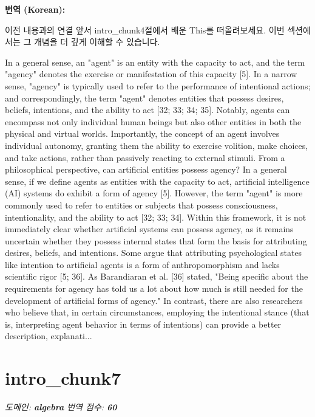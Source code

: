 \documentclass[12pt,a4paper]{article}
\begin{document}
\begin{mdframed}[style=ko]
\noindent\textbf{\small 번역 (Korean):}\\[2pt]
\begin{linkbox}{이전 내용과의 연결}
  앞서 intro_chunk4절에서 배운 This를 떠올려보세요. 이번 섹션에서는 그 개념을 더 깊게 이해할 수 있습니다.
\end{linkbox}
In a general sense, an "agent" is an entity with the capacity to act, and the term "agency" denotes the exercise or manifestation of this capacity [5]. In a narrow sense, "agency" is typically used to refer to the performance of intentional actions; and correspondingly, the term "agent" denotes entities that possess desires, beliefs, intentions, and the ability to act [32; 33; 34; 35]. Notably, agents can encompass not only individual human beings but also other entities in both the physical and virtual worlds. Importantly, the concept of an agent involves individual autonomy, granting them the ability to exercise volition, make choices, and take actions, rather than passively reacting to external stimuli. From a philosophical perspective, can artificial entities possess agency? In a general sense, if we define agents as entities with the capacity to act, artificial intelligence (AI) systems do exhibit a form of agency [5]. However, the term "agent" is more commonly used to refer to entities or subjects that possess consciousness, intentionality, and the ability to act [32; 33; 34]. Within this framework, it is not immediately clear whether artificial systems can possess agency, as it remains uncertain whether they possess internal states that form the basis for attributing desires, beliefs, and intentions. Some argue that attributing psychological states like intention to artificial agents is a form of anthropomorphism and lacks scientific rigor [5; 36]. As Barandiaran et al. [36] stated, "Being specific about the requirements for agency has told us a lot about how much is still needed for the development of artificial forms of agency." In contrast, there are also researchers who believe that, in certain circumstances, employing the intentional stance (that is, interpreting agent behavior in terms of intentions) can provide a better description, explanati...
\end{mdframed}
\vspace{1em}

\section{intro\_chunk7}
\noindent\textit{\small 도메인: \textbf{algebra} \quad 번역 점수: \textbf{\color{orange!80!black}60}}
\vspace{0.5em}
\end{document}
